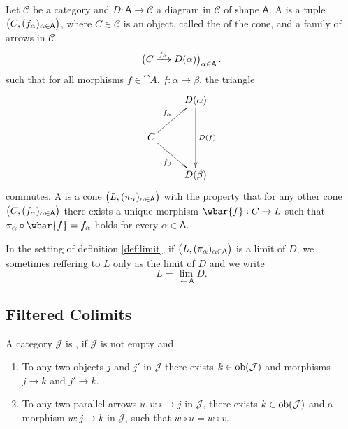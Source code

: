 \begin{definition}
	Let $\mathcal{C}$ be a category and $D : \mathsf{A} \to \mathcal{C}$ a diagram in $\mathcal{C}$ of shape $\mathsf{A}$. A  is a tuple $\del[1]{C,(f_\alpha)_{\alpha \in \mathsf{A}}}$, where $C \in \mathcal{C}$ is an object, called the  of the cone, and a family of arrows in $\mathcal{C}$
	\begin{equation}
		\del[1]{C \xrightarrow{f_\alpha} D(\alpha)}_{\alpha \in \mathsf{A}}.
	\end{equation}
	\noindent such that for all morphisms $f \in \cat{A}$, $f : \alpha \to \beta$, the triangle
	\begin{equation*}
		\xymatrix{
			& D(\alpha) \ar[dd]^{D(f)}\\
			C \ar[ur]^{f_\alpha}\ar[dr]_{f_\beta}\\
			& D(\beta)}
	\end{equation*}
	\noindent commutes. A  is a cone $\del[1]{L, (\pi_\alpha)_{\alpha \in \mathsf{A}}}$ with the property that for any other cone $\del[1]{C,(f_\alpha)_{\alpha \in \mathsf{A}}}$ there exists a unique morphism $\wbar{f} : C \to L$ such that $\pi_\alpha \circ \wbar{f} = f_\alpha$ holds for every $\alpha \in \mathsf{A}$.
	\label{def:limit}
\end{definition}

\begin{remark}
	In the setting of definition \ref{def:limit}, if $\del[1]{L, (\pi_\alpha)_{\alpha \in \cat{A}}}$ is a limit of $D$, we sometimes reffering to $L$ only as the limit of $D$ and we write
	\begin{equation}
		L = \lim_{\leftarrow \mathsf{A}} D.
	\end{equation}
\end{remark}

\subsection*{Filtered Colimits}
\begin{definition}
	A category $\mathcal{J}$ is , if $\mathcal{J}$ is not empty and
	\begin{enumerate}[label = \textup{(}\alph*\textup{)},wide = 0pt]
		\item To any two objects $j$ and $j'$ in $\mathcal{J}$ there exists $k \in \operatorname{ob}(\mathcal{J})$ and morphisms $j \to k$ and $j' \to k$.
		\item To any two parallel arrows $u,v : i \to j$ in $\mathcal{J}$, there exists $k \in \operatorname{ob}(\mathcal{J})$ and a morphism $w : j \to k$ in $\mathcal{J}$, such that $w \circ u = w \circ v$.
	\end{enumerate}
\end{definition}

